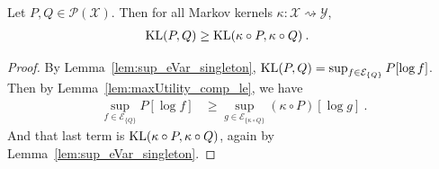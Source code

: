 \begin{theorem}\label{thm:dataprocessing_kl}
  Let $P, Q \in \mathcal{P}(\mathcal{X})$.
  Then for all Markov kernels $\kappa : \mathcal{X} \rightsquigarrow \mathcal{Y}$,
  \begin{align*}
    \operatorname{KL}(P, Q)
    &\ge \operatorname{KL}(\kappa \circ P, \kappa \circ Q)
    \: .
  \end{align*}
\end{theorem}

\begin{proof}
By Lemma~\ref{lem:sup_eVar_singleton}, $\operatorname{KL}(P, Q) = \sup_{f \in \mathcal{E}_{\{Q\}}} P[\log f]$.
Then by Lemma~\ref{lem:maxUtility_comp_le}, we have
\begin{align*}
  \sup_{f \in \mathcal{E}_{\{Q\}}} P[\log f]
  &\ge \sup_{g \in \mathcal{E}_{\{\kappa \circ Q\}}} (\kappa \circ P)[\log g]
  \: .
\end{align*}
And that last term is $\operatorname{KL}(\kappa \circ P, \kappa \circ Q)$, again by Lemma~\ref{lem:sup_eVar_singleton}.
\end{proof}
